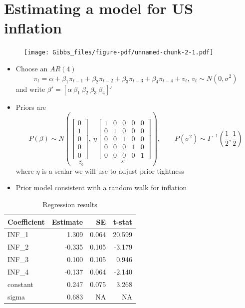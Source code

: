 \documentclass[
  letterpaper,
]{book}
\providecommand{\tightlist}{%
  \setlength{\itemsep}{0pt}\setlength{\parskip}{0pt}}\usepackage{longtable,booktabs,array}
\begin{document}
\hypertarget{estimating-a-model-for-us-inflation}{%
\section{Estimating a model for US
inflation}\label{estimating-a-model-for-us-inflation}}

\begin{figure}

{\centering \texttt{[image: Gibbs\_files/figure-pdf/unnamed-chunk-2-1.pdf]}

}

\end{figure}

\begin{itemize}
\tightlist
\item
  Choose an \(AR(4)\) \[
   \pi_t = \alpha + \beta_1 \pi_{t-1} + \beta_2 \pi_{t-2} + \beta_3 \pi_{t-3} + \beta_4 \pi_{t-4} + v_t\text{, }v_t\sim N(0,\sigma^2)
  \] and write
  \(\beta' = [\alpha\ \beta_1\ \beta_2\ \beta_3\ \beta_4]'\)
\item
  Priors are \[
  P(\beta) \sim N\left( \underset{\beta_0} {\left[ 
  \begin{array}{c}
  0 \\ 
  1 \\ 
  0 \\
  0 \\ 
  0
  \end{array}
  \right],}\ \underset{\Sigma} {\eta\left[ 
  \begin{array}{ccc}
  1 & 0 & 0 & 0 & 0\\ 
  0 & 1 & 0 & 0 & 0\\ 
  0 & 0 & 1 & 0 & 0\\
  0 & 0 & 0 & 1 & 0\\
  0 & 0 & 0 & 0 & 1
  \end{array}
  \right] }\right), \qquad
  P(\sigma^2) \sim \Gamma^{-1}\left( \frac{1}{2},\frac{1}{2}\right)
  \] where \(\eta\) is a scalar we will use to adjust prior tightness
\item
  Prior model consistent with a random walk for inflation
\end{itemize}

\begin{table}

\caption{Regression results}
\centering
\begin{tabular}[t]{lrrr}
\toprule
Coefficient & Estimate & SE & t-stat\\
\midrule
INF\_1 & 1.309 & 0.064 & 20.599\\
INF\_2 & -0.335 & 0.105 & -3.179\\
INF\_3 & 0.100 & 0.105 & 0.946\\
INF\_4 & -0.137 & 0.064 & -2.140\\
constant & 0.247 & 0.075 & 3.268\\
\addlinespace
sigma & 0.683 & NA & NA\\
\bottomrule
\end{tabular}
\end{table}
\end{document}
